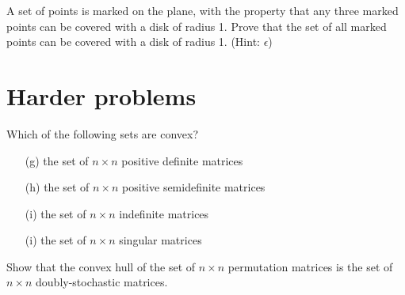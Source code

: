 \documentclass{article}
\begin{document}
\fi



\begin{exercise}

A set of points is marked on the plane, with the property that any three marked points can be covered with a disk of radius 1. Prove that the set of all marked points can be covered with a disk of radius 1. (Hint: $\epsilon$)

\end{exercise}



\iffalse

\begin{exercise}

Let $A_1,A_2,\ldots,A_n$ be lines in $\mathbb{R}^3$ such that for any three $i,j,k\in\{1,2,\ldots,n\}$, there exists a line that intersects $A_i$, $A_j$, and $A_k$. Show that there is a line that intersects each of the $A_i$. (Hint: $\epsilon$)

\end{exercise}

\fi



\section{Harder problems}



\begin{exercise}

Which of the following sets are convex?

\begin{itemize}

\item[(g)] the set of $n\times n$ positive definite matrices

\item[(h)] the set of $n\times n$ positive semidefinite matrices

\item[(i)] the set of $n\times n$ indefinite matrices

\item[(i)] the set of $n\times n$ singular matrices

\end{itemize}

\end{exercise}



\begin{exercise}

Show that the convex hull of the set of $n\times n$ permutation matrices is the set of $n\times n$ doubly-stochastic matrices.

\end{exercise}
\end{document}
